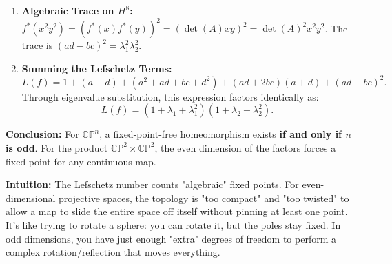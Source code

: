\begin{solution}
\begin{enumerate}
    \item \textbf{Algebraic Trace on $H^8$:}
    $f^*(x^2y^2) = (f^*(x)f^*(y))^2 = (\det(A) xy)^2 = \det(A)^2 x^2y^2$.
    The trace is $(ad-bc)^2 = \lambda_1^2 \lambda_2^2$.

    \item \textbf{Summing the Lefschetz Terms:}
    \[ L(f) = 1 + (a+d) + (a^2 + ad + bc + d^2) + (ad+2bc)(a+d) + (ad-bc)^2. \]
    Through eigenvalue substitution, this expression factors identically as:
    \[ L(f) = (1 + \lambda_1 + \lambda_1^2)(1 + \lambda_2 + \lambda_2^2). \]
\end{enumerate}

\textbf{Conclusion:}
For $\mathbb{CP}^n$, a fixed-point-free homeomorphism exists \textbf{if and only if $n$ is odd}. For the product $\mathbb{CP}^2 \times \mathbb{CP}^2$, the even dimension of the factors forces a fixed point for any continuous map.

\textbf{Intuition:}
The Lefschetz number counts "algebraic" fixed points. For even-dimensional projective spaces, the topology is "too compact" and "too twisted" to allow a map to slide the entire space off itself without pinning at least one point. It's like trying to rotate a sphere: you can rotate it, but the poles stay fixed. In odd dimensions, you have just enough "extra" degrees of freedom to perform a complex rotation/reflection that moves everything.
\end{solution}

